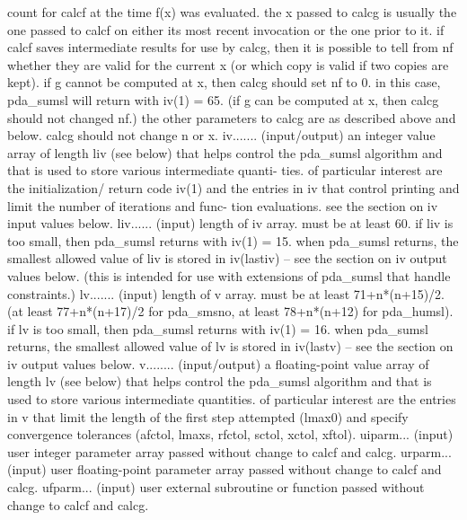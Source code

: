 \documentclass[11pt,twoside,nolof]{starlink}
\begin{document}
\begin{terminalv}
                   count for calcf at the time f(x) was evaluated.  the
                   x passed to calcg is usually the one passed to calcf
                   on either its most recent invocation or the one
                   prior to it.  if calcf saves intermediate results
                   for use by calcg, then it is possible to tell from
                   nf whether they are valid for the current x (or
                   which copy is valid if two copies are kept).  if g
                   cannot be computed at x, then calcg should set nf to
                   0.  in this case, pda_sumsl will return with iv(1) = 65.
                   (if g can be computed at x, then calcg should not
                   changed nf.)  the other parameters to calcg are as
                   described above and below.  calcg should not change
                   n or x.
  iv....... (input/output) an integer value array of length liv (see
                   below) that helps control the pda_sumsl algorithm and
                   that is used to store various intermediate quanti-
                   ties.  of particular interest are the initialization/
                   return code iv(1) and the entries in iv that control
                   printing and limit the number of iterations and func-
                   tion evaluations.  see the section on iv input
                   values below.
  liv...... (input) length of iv array.  must be at least 60.  if liv
                   is too small, then pda_sumsl returns with iv(1) = 15.
                   when pda_sumsl returns, the smallest allowed value of
                   liv is stored in iv(lastiv) -- see the section on
                   iv output values below.  (this is intended for use
                   with extensions of pda_sumsl that handle constraints.)
  lv....... (input) length of v array.  must be at least 71+n*(n+15)/2.
                   (at least 77+n*(n+17)/2 for pda_smsno, at least
                   78+n*(n+12) for pda_humsl).  if lv is too small, then
                   pda_sumsl returns with iv(1) = 16.  when pda_sumsl returns,
                   the smallest allowed value of lv is stored in
                   iv(lastv) -- see the section on iv output values
                   below.
  v........ (input/output) a floating-point value array of length lv
                   (see below) that helps control the pda_sumsl algorithm
                   and that is used to store various intermediate
                   quantities.  of particular interest are the entries
                   in v that limit the length of the first step
                   attempted (lmax0) and specify convergence tolerances
                   (afctol, lmaxs, rfctol, sctol, xctol, xftol).
  uiparm... (input) user integer parameter array passed without change
                   to calcf and calcg.
  urparm... (input) user floating-point parameter array passed without
                   change to calcf and calcg.
  ufparm... (input) user external subroutine or function passed without
                   change to calcf and calcg.


\end{terminalv}
\end{document}
